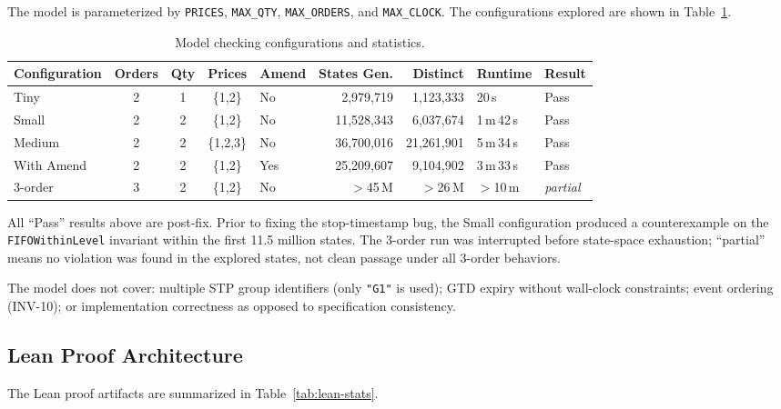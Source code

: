 \documentclass[11pt,a4paper]{article}
\begin{document}
The model is parameterized by \texttt{PRICES}, \texttt{MAX\_QTY},
\texttt{MAX\_ORDERS}, and \texttt{MAX\_CLOCK}. The configurations
explored are shown in Table~\ref{tab:configs}.

\begin{table}[H]
\centering
\caption{Model checking configurations and statistics.}
\label{tab:configs}
\small
\begin{tabular}{@{}lccclrrll@{}}
\toprule
Configuration & Orders & Qty & Prices & Amend & States Gen. & Distinct & Runtime & Result \\
\midrule
Tiny          & 2 & 1 & \{1,2\}   & No  &    2,979,719 &  1,123,333 & 20\,s     & Pass \\
Small         & 2 & 2 & \{1,2\}   & No  &   11,528,343 &  6,037,674 & 1\,m\,42\,s & Pass \\
Medium        & 2 & 2 & \{1,2,3\} & No  &   36,700,016 & 21,261,901 & 5\,m\,34\,s & Pass \\
With Amend    & 2 & 2 & \{1,2\}   & Yes &   25,209,607 &  9,104,902 & 3\,m\,33\,s & Pass \\
3-order       & 3 & 2 & \{1,2\}   & No  & $>$45\,M     & $>$26\,M   & $>$10\,m  & \emph{partial} \\
\bottomrule
\end{tabular}

\medskip
\raggedright\footnotesize
All ``Pass'' results above are post-fix. Prior to fixing the stop-timestamp
bug, the Small configuration produced a counterexample on the
\texttt{FIFOWithinLevel} invariant within the first 11.5 million states. The
3-order run was interrupted before state-space exhaustion; ``partial'' means no
violation was found in the explored states, not clean passage under all
3-order behaviors.
\end{table}

The model does not cover: multiple STP group identifiers (only
\texttt{"G1"} is used); GTD expiry without wall-clock constraints;
event ordering (INV-10); or implementation correctness as opposed to
specification consistency.

\subsection{Lean Proof Architecture}
\label{sec:lean-arch}

The Lean proof artifacts are summarized in Table~\ref{tab:lean-stats}.
\end{document}
